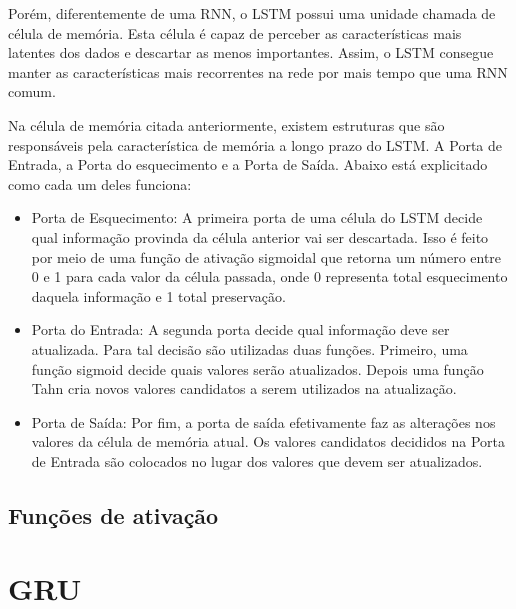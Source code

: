 
Porém, diferentemente de uma \acrshort{RNN}, o LSTM possui uma unidade chamada de célula de memória. Esta célula é capaz de perceber as características mais latentes dos dados e descartar as menos importantes. Assim, o \acrshort{LSTM} consegue manter as características mais recorrentes na rede por mais tempo que uma \acrshort{RNN} comum. 

Na célula de memória citada anteriormente, existem estruturas que são responsáveis pela característica de memória a longo prazo do \acrshort{LSTM}. A Porta de Entrada, a Porta do esquecimento e a Porta de Saída. Abaixo está explicitado como cada um deles funciona:
\begin{itemize}
  \item Porta de Esquecimento: A primeira porta de uma célula do \acrfull{LSTM} decide qual informação provinda da célula anterior vai ser descartada. Isso é feito por meio de uma função de ativação sigmoidal que retorna um número entre 0 e 1 para cada valor da célula passada, onde 0 representa total esquecimento daquela informação e 1 total preservação.
  
  \item Porta do Entrada: A segunda porta decide qual informação deve ser atualizada. Para tal decisão são utilizadas duas funções. Primeiro, uma função sigmoid decide quais valores serão atualizados. Depois uma função Tahn cria novos valores candidatos a serem utilizados na atualização.
  \item Porta de Saída: Por fim, a porta de saída efetivamente faz as alterações nos valores da célula de memória atual. Os valores candidatos decididos na Porta de Entrada são colocados no lugar dos valores que devem ser atualizados.
\end{itemize}


\subsection{Funções de ativação}

\section{\acrfull{GRU}}


